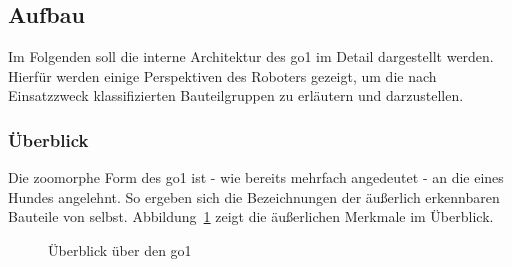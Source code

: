 \subsection{Aufbau}
\label{subsec:aufbau}

Im Folgenden soll die interne Architektur des \gls{go1} im Detail dargestellt werden.
Hierfür werden einige Perspektiven des Roboters gezeigt, um die nach Einsatzzweck klassifizierten Bauteilgruppen zu erläutern und darzustellen.

\subsubsection{Überblick}

Die zoomorphe Form des \gls{go1} ist - wie bereits mehrfach angedeutet - an die eines Hundes angelehnt.
So ergeben sich die Bezeichnungen der äußerlich erkennbaren Bauteile von selbst.
Abbildung~\ref{fig:allgemeine_architektur} zeigt die äußerlichen Merkmale im Überblick.

\begin{figure}[h]
    \caption{Überblick über den \gls{go1}}\label{fig:allgemeine_architektur}
\end{figure}

